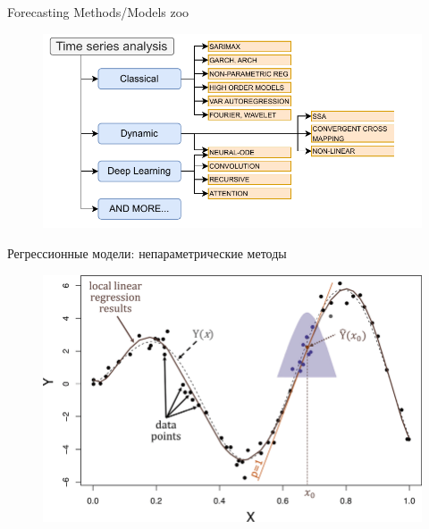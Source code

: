 
\usepackage{tikz}
\usepackage[english,russian]{babel}
\usetikzlibrary{arrows,shapes,positioning,shadows,trees}




\begin{frame}
\titlepage
\end{frame}
\begin{frame}{Forecasting Methods/Models zoo}
    \begin{figure}
        \includegraphics[width=1.1\linewidth, left]{./figs/init_diagram.pdf}
    \end{figure}
\end{frame}
\begin{frame}{Регрессионные модели: непараметрические методы}
	\begin{figure}
		\centering
		\includegraphics[width=0.8\linewidth]{lecture_1/figs/kernel_reg.png}
	\end{figure}
\end{frame}
